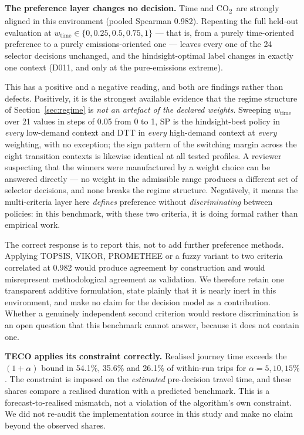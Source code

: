 \documentclass[10pt,a4paper]{article}
\newcommand{\CO}{CO\textsubscript{2}}
\begin{document}
\textbf{The preference layer changes no decision.} Time and \CO\ are strongly aligned in this environment (pooled Spearman 0.982). Repeating the full held-out evaluation at $w_{\text{time}}\in\{0,0.25,0.5,0.75,1\}$ --- that is, from a purely time-oriented preference to a purely emissions-oriented one --- leaves every one of the 24 selector decisions unchanged, and the hindsight-optimal label changes in exactly one context (D011, and only at the pure-emissions extreme).

This has a positive and a negative reading, and both are findings rather than defects. Positively, it is the strongest available evidence that the regime structure of Section~\ref{sec:regime} is \emph{not an artefact of the declared weights}. Sweeping $w_{\text{time}}$ over 21 values in steps of 0.05 from 0 to 1, SP is the hindsight-best policy in \emph{every} low-demand context and DTT in \emph{every} high-demand context at \emph{every} weighting, with no exception; the sign pattern of the switching margin across the eight transition contexts is likewise identical at all tested profiles. A reviewer suspecting that the winners were manufactured by a weight choice can be answered directly --- no weight in the admissible range produces a different set of selector decisions, and none breaks the regime structure. Negatively, it means the multi-criteria layer here \emph{defines} preference without \emph{discriminating} between policies: in this benchmark, with these two criteria, it is doing formal rather than empirical work.

The correct response is to report this, not to add further preference methods. Applying TOPSIS, VIKOR, PROMETHEE or a fuzzy variant to two criteria correlated at 0.982 would produce agreement by construction and would misrepresent methodological agreement as validation. We therefore retain one transparent additive formulation, state plainly that it is nearly inert in this environment, and make no claim for the decision model as a contribution. Whether a genuinely independent second criterion would restore discrimination is an open question that this benchmark cannot answer, because it does not contain one.

\textbf{TECO applies its constraint correctly.} Realised journey time exceeds the $(1+\alpha)$ bound in 54.1\%, 35.6\% and 26.1\% of within-run trips for $\alpha=5,10,15\%$. The constraint is imposed on the \emph{estimated} pre-decision travel time, and these shares compare a realised duration with a predicted benchmark. This is a forecast-to-realised mismatch, not a violation of the algorithm's own constraint. We did not re-audit the implementation source in this study and make no claim beyond the observed shares.
\end{document}
